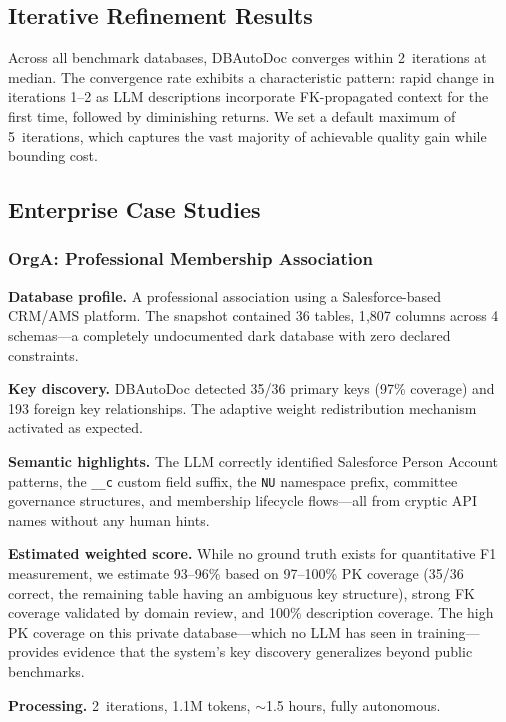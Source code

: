 \documentclass[sigconf, nonacm]{acmart}
\begin{document}
\subsection{Iterative Refinement Results}

Across all benchmark databases, DBAutoDoc converges within 2~iterations at median. The convergence rate exhibits a characteristic pattern: rapid change in iterations 1--2 as LLM descriptions incorporate FK-propagated context for the first time, followed by diminishing returns. We set a default maximum of 5~iterations, which captures the vast majority of achievable quality gain while bounding cost.

\subsection{Enterprise Case Studies}\label{sec:enterprise}

\subsubsection{OrgA: Professional Membership Association}

\textbf{Database profile.} A professional association using a Salesforce-based CRM/AMS platform. The snapshot contained 36 tables, 1{,}807 columns across 4 schemas---a completely undocumented dark database with zero declared constraints.

\textbf{Key discovery.} DBAutoDoc detected 35/36 primary keys (97\% coverage) and 193 foreign key relationships. The adaptive weight redistribution mechanism activated as expected.

\textbf{Semantic highlights.} The LLM correctly identified Salesforce Person Account patterns, the \texttt{\_\_c} custom field suffix, the \texttt{NU} namespace prefix, committee governance structures, and membership lifecycle flows---all from cryptic API names without any human hints.

\textbf{Estimated weighted score.} While no ground truth exists for quantitative F1 measurement, we estimate 93--96\% based on 97--100\% PK coverage (35/36 correct, the remaining table having an ambiguous key structure), strong FK coverage validated by domain review, and 100\% description coverage. The high PK coverage on this private database---which no LLM has seen in training---provides evidence that the system's key discovery generalizes beyond public benchmarks.

\textbf{Processing.} 2~iterations, 1.1M tokens, $\sim$1.5 hours, fully autonomous.
\end{document}
